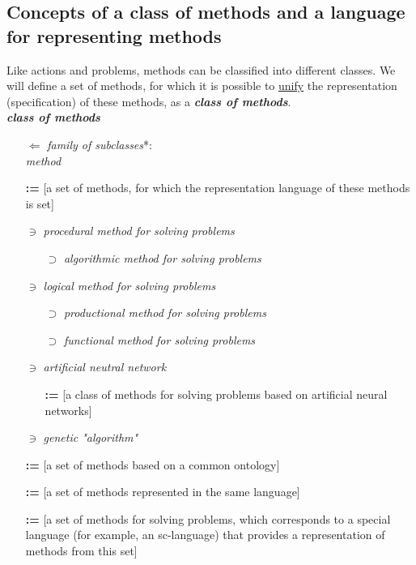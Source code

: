 \documentclass{report}
\begin{document}
\begin{multicols}{2}
\section{Concepts of a class of methods and a language for representing methods}

Like actions and problems, methods can be classified
into different classes. We will define a set of methods,
for which it is possible to \underline{unify} the representation
(specification) of these methods, as a \textbf{\textit{class of methods}}.
\vspace{4mm}
\\ \textbf{\textit{class of methods}}

\begin{itemize}[noitemsep]
    \item [$\Leftarrow$] \textit{family of subclasses}*:\\ \textit{method}
    \item [\textbf{:=}] [a set of methods, for which the representation language of these methods is set]
    \item [$\ni$] \textit{procedural method for solving problems}
    \begin{itemize}[noitemsep]
        \item [$\supset$] \textit{algorithmic method for solving problems}
    \end{itemize}
    \item [$\ni$] \textit{logical method for solving problems}
    \begin{itemize}[noitemsep]
        \item [$\supset$] \textit{productional method for solving problems}
        \item [$\supset$] \textit{functional method for solving problems}
    \end{itemize}
    \item [$\ni$] \textit{artificial neutral network}
    \begin{itemize}[noitemsep]
        \item [\textbf{:=}] [a class of methods for solving problems based on artificial neural networks]
    \end{itemize}
    \item [$\ni$] \textit{genetic "algorithm"}
    \item [\textbf{:=}] [a set of methods based on a common ontology]
    \item [\textbf{:=}] [a set of methods represented in the same language]
    \item [\textbf{:=}] [a set of methods for solving problems, which corresponds to a special language (for example, an sc-language) that provides a representation of methods from this set]

\end{itemize}
\end{multicols}
\end{document}
